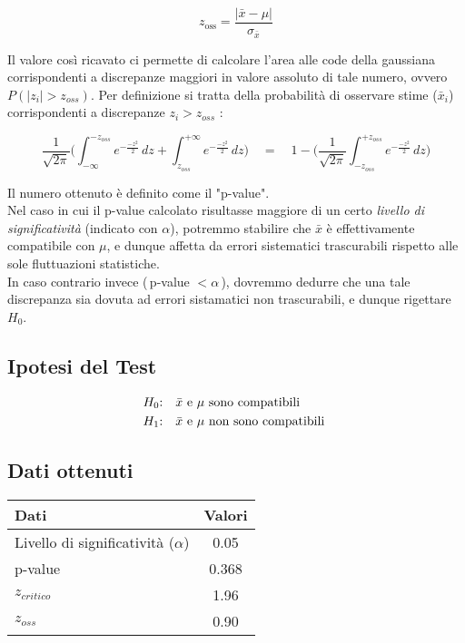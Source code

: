 \documentclass{article}
\begin{document}
\[ z_{\text{oss}} = \frac{| \bar{x} - \mu |}{\sigma_{\bar{x}}} \]
\vspace{0.1 cm}

\noindent Il valore così ricavato ci permette di calcolare l'area alle code della gaussiana corrispondenti a discrepanze maggiori in valore assoluto di tale numero, ovvero $P( | z_i |> z_{oss} )$. Per definizione si tratta della probabilità di osservare stime ($\bar{x}_i$) corrispondenti a discrepanze $ z_i  > z_{oss}$ :
\vspace{0.2cm}

\[ \frac{1}{\sqrt{2\pi}} \bigg( \int_{-\infty}^{- z_{oss}}e^{-\frac{-z^2}{2}} \,dz +  \int_{z_{oss}}^{+ \infty}e^{-\frac{-z^2}{2}} \,dz \bigg)  \quad = \quad 1 - \bigg( \frac{1}{\sqrt{2\pi}} \int_{-z_{oss}}^{+ z_{oss}}e^{-\frac{-z^2}{2}} \,dz \bigg) \]
\vspace{0.2cm}

\noindent Il numero ottenuto è definito come il "p-value".\\
 Nel caso in cui il p-value calcolato risultasse maggiore di un certo \textit{livello di significatività} (indicato con $\alpha$), potremmo stabilire che $\bar{x}$ è effettivamente compatibile con $\mu$, e dunque affetta da errori sistematici trascurabili rispetto alle sole fluttuazioni statistiche.\\
	
In caso contrario invece ($\,$p-value $ < \alpha\,$), dovremmo dedurre che una tale discrepanza sia dovuta ad errori sistamatici non trascurabili, e dunque rigettare $H_0$.

\newpage

\subsection{Ipotesi del Test}
\begin{align*}
	&\text{$H_0$:} \text{\quad $\bar{x}$ e $\mu$ sono compatibili}  \\ \
	&\text{$H_1$:} \text{\quad $\bar{x}$ e $\mu$ non sono compatibili } \
\end{align*}

\subsection{Dati ottenuti}

\begin{table}[ht]
	\centering
	\begin{tabular}{@{}lc@{}}
		\toprule
		\textbf{Dati} & \textbf{Valori} \\
		\midrule
			   Livello di significatività ($\alpha $) & 0.05 \\
			   p-value & 0.368 \\
		       $z_{critico}$ &  1.96 \\
		  	   $z_{oss}$ & 0.90 \\
		\bottomrule
	\end{tabular}
\end{table}
\end{document}
